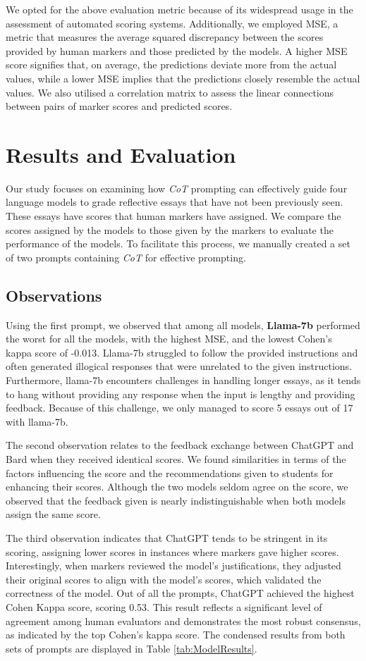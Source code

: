\documentclass{article}
\begin{document}
We opted for the above evaluation metric because of its widespread usage in the assessment of automated scoring systems. Additionally, we employed MSE, a metric that measures the average squared discrepancy between the scores provided by human markers and those predicted by the models. A higher MSE score signifies that, on average, the predictions deviate more from the actual values, while a lower MSE implies that the predictions closely resemble the actual values. We also utilised a correlation matrix to assess the linear connections between pairs of marker scores and predicted scores. 
\section{Results and Evaluation}

Our study focuses on examining how \textit{CoT} prompting can effectively guide four language models to grade reflective essays that have not been previously seen. These essays have scores that human markers have assigned. We compare the scores assigned by the models to those given by the markers to evaluate the performance of the models. To facilitate this process, we manually created a set of two prompts containing  \textit{CoT} for effective prompting. 

\subsection{Observations}
Using the first prompt, we observed that among all models, \textbf{Llama-7b} performed the worst for all the models, with the highest MSE, and the lowest Cohen's kappa score of -0.013. Llama-7b struggled to follow the provided instructions and often generated illogical responses that were unrelated to the given instructions. Furthermore, llama-7b encounters challenges in handling longer essays, as it tends to hang without providing any response when the input is lengthy and providing feedback. Because of this challenge, we only managed to score 5 essays out of 17 with llama-7b. 

The second observation relates to the feedback exchange between ChatGPT and Bard when they received identical scores. We found similarities in terms of the factors influencing the score and the recommendations given to students for enhancing their scores. Although the two models seldom agree on the score, we observed that the feedback given is nearly indistinguishable when both models assign the same score. 

The third observation indicates that ChatGPT tends to be stringent in its scoring, assigning lower scores in instances where markers gave higher scores. Interestingly, when markers reviewed the model's justifications, they adjusted their original scores to align with the model's scores, which validated the correctness of the model.  Out of all the prompts, ChatGPT achieved the highest Cohen Kappa score, scoring  0.53. This result reflects a significant level of agreement among human evaluators and demonstrates the most robust consensus, as indicated by the top Cohen's kappa score. The condensed results from both sets of prompts are displayed in Table \ref{tab:ModelResults}.
\end{document}
